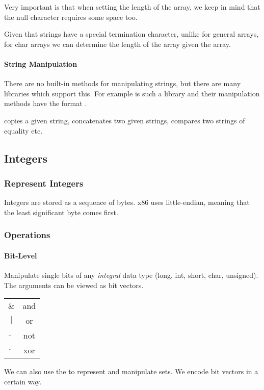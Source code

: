 Very important is that when setting the length of the array, we keep in mind that the null character requires some space too.

Given that strings have a special termination character, unlike for general arrays, for char arrays we can determine the length of the array given the array.

\paragraph{String Manipulation}
There are no built-in methods for manipulating strings, but there are many libraries which support this. For example  is such a library and their manipulation methods have the format .

 copies a given string,  concatenates two given strings,  compares two strings of equality etc.

\subsection*{Integers}

\subsubsection{Represent Integers}
Integers are stored as a sequence of bytes. x86 uses little-endian, meaning that the least significant byte comes first.

\subsubsection{Operations}
\paragraph{Bit-Level}
Manipulate single bits of any \textit{integral} data type (long, int, short, char, unsigned). The arguments can be viewed as bit vectors.

\begin{tabular}{c | c}
    $\&$ & and\\
    $|$ & or\\
    $\tilde{}$ & not\\
    $\hat{}$ & xor
\end{tabular}

We can also use the to represent and manipulate sets. We encode bit vectors in a certain way. %

